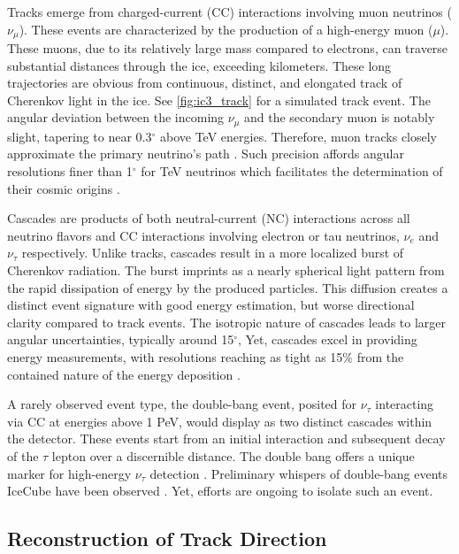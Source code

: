 Tracks emerge from charged-current (CC) interactions involving muon neutrinos ($\nu_\mu$).
These events are characterized by the production of a high-energy muon ($\mu$).
These muons, due to its relatively large mass compared to electrons, can traverse substantial distances through the ice, exceeding kilometers.
These long trajectories are obvious from continuous, distinct, and elongated track of Cherenkov light in the ice.
See \cref{fig:ic3_track} for a simulated track event.
The angular deviation between the incoming $\nu_\mu$ and the secondary muon is notably slight, tapering to near 0.3$^\circ$ above TeV energies.
Therefore, muon tracks closely approximate the primary neutrino's path \cite{physics_withIC3,IC3_energyReco}.
Such precision affords angular resolutions finer than 1$^\circ$ for TeV neutrinos which facilitates the determination of their cosmic origins \cite{physics_withIC3}.

Cascades are products of both neutral-current (NC) interactions across all neutrino flavors and CC interactions involving electron or tau neutrinos, $\nu_e$ and $\nu_\tau$ respectively.
Unlike tracks, cascades result in a more localized burst of Cherenkov radiation.
The burst imprints as a nearly spherical light pattern from the rapid dissipation of energy by the produced particles.
This diffusion creates a distinct event signature with good energy estimation, but worse directional clarity compared to track events.
The isotropic nature of cascades leads to larger angular uncertainties, typically around 15$^\circ$,
Yet, cascades excel in providing energy measurements, with resolutions reaching as tight as 15\% from the contained nature of the energy deposition \cite{physics_withIC3,IC3_energyReco}.

A rarely observed event type, the double-bang event, posited for $\nu_\tau$ interacting via CC at energies above 1 PeV, would display as two distinct cascades within the detector.
These events start from an initial interaction and subsequent decay of the $\tau$ lepton over a discernible distance.
The double bang offers a unique marker for high-energy $\nu_\tau$ detection \cite{physics_withIC3}.
Preliminary whispers of double-bang events IceCube have been observed \cite{IC3_taus}.
Yet, efforts are ongoing to isolate such an event.

\subsection{Reconstruction of Track Direction}

